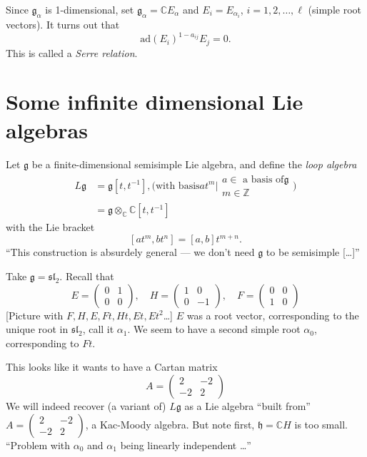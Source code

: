 \begin{remark}
\label{remark-}
Since $\mathfrak{g}_\alpha$ is 1-dimensional,
set
$\mathfrak{g}_\alpha=\mathbb{C}E_\alpha$ and
$E_i=E_{\alpha_i}$, $i=1,2,\ldots,\ell$
(simple root vectors).
It turns out that
$$
\text{ad}(E_i)^{1-a_{ij}}E_j=0.
$$
This is called a {\it Serre relation}.
\end{remark}

\section{Some infinite dimensional Lie
algebras}
\label{section-some-infin-dimen-lie-algeb}
Let $\mathfrak{g}$ be a finite-dimensional
semisimple Lie algebra, and define
the {\it loop algebra}
$$
\begin{aligned}
L\mathfrak{g}&=\mathfrak{g}[t,t^{-1}],\text{
(with basis
$at^m|\substack{\text{$a \in $ a basis of
$\mathfrak{g}$} \\ m \in \mathbb{Z}}$
)}\\
&=\mathfrak{g} \otimes
_{\mathbb{C}}\mathbb{C}[t,t^{-1}]
\end{aligned}
$$
with the Lie bracket
$$
[at^m,bt^n]=[a,b]t^{m+n}.
$$
``This construction is absurdely general ---
we don't need $\mathfrak{g}$ to be
semisimple […]''

\medskip\noindent
Take $\mathfrak{g}=\mathfrak{sl}_2$. Recall
that
$$
E=\begin{pmatrix}
0&1\\
0&0
\end{pmatrix},\quad
H=\begin{pmatrix}
1&0\\
0&-1
\end{pmatrix},\quad
F=\begin{pmatrix}
0&0\\
1&0
\end{pmatrix}
$$
[Picture with $F,H,E,Ft,Ht,Et,Et^2$…]
$E$ was a root vector, corresponding to the
unique root in $\mathfrak{sl}_2$,
call it $\alpha_1$. We seem to have a second
simple root $\alpha_0$,
 corresponding to $Ft$.

This looks like it wants to have a Cartan
matrix
 $$
A=\begin{pmatrix}
2&-2\\
-2&2
\end{pmatrix}
$$
We will indeed recover (a variant of)
$L\mathfrak{g}$ as a Lie algebra
``built from'' $A=\begin{pmatrix}
2&-2\\
-2&2
\end{pmatrix}$,
 a Kac-Moody algebra.
But note first, $\mathfrak{h}=\mathbb{C}H$ is
too small.
``Problem with $\alpha_0$ and $\alpha_1$
being linearly independent  …''

